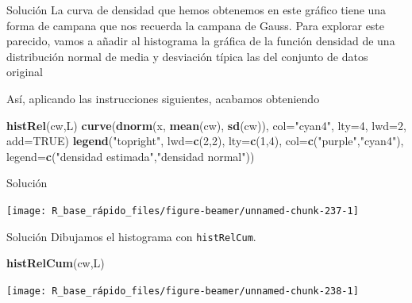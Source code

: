 \documentclass[
  ignorenonframetext,
  aspectratio=169]{beamer}
\newenvironment{Shaded}{\begin{snugshade}}{\end{snugshade}}
\newcommand{\AttributeTok}[1]{\textcolor[rgb]{0.13,0.29,0.53}{#1}}
\newcommand{\ConstantTok}[1]{\textcolor[rgb]{0.56,0.35,0.01}{#1}}
\newcommand{\DecValTok}[1]{\textcolor[rgb]{0.00,0.00,0.81}{#1}}
\newcommand{\FunctionTok}[1]{\textcolor[rgb]{0.13,0.29,0.53}{\textbf{#1}}}
\newcommand{\NormalTok}[1]{#1}
\newcommand{\StringTok}[1]{\textcolor[rgb]{0.31,0.60,0.02}{#1}}
\begin{document}
\begin{frame}[fragile]{Solución}
\label{soluciuxf3n-46}
La curva de densidad que hemos obtenemos en este gráfico tiene una forma
de campana que nos recuerda la campana de Gauss. Para explorar este
parecido, vamos a añadir al histograma la gráfica de la función densidad
de una distribución normal de media y desviación típica las del conjunto
de datos original

Así, aplicando las instrucciones siguientes, acabamos obteniendo

\begin{Shaded}
\begin{Highlighting}[]
\FunctionTok{histRel}\NormalTok{(cw,L)}
\FunctionTok{curve}\NormalTok{(}\FunctionTok{dnorm}\NormalTok{(x, }\FunctionTok{mean}\NormalTok{(cw), }\FunctionTok{sd}\NormalTok{(cw)), }\AttributeTok{col=}\StringTok{"cyan4"}\NormalTok{, }\AttributeTok{lty=}\DecValTok{4}\NormalTok{, }\AttributeTok{lwd=}\DecValTok{2}\NormalTok{,}
\AttributeTok{add=}\ConstantTok{TRUE}\NormalTok{)}
\FunctionTok{legend}\NormalTok{(}\StringTok{"topright"}\NormalTok{, }\AttributeTok{lwd=}\FunctionTok{c}\NormalTok{(}\DecValTok{2}\NormalTok{,}\DecValTok{2}\NormalTok{), }\AttributeTok{lty=}\FunctionTok{c}\NormalTok{(}\DecValTok{1}\NormalTok{,}\DecValTok{4}\NormalTok{), }\AttributeTok{col=}\FunctionTok{c}\NormalTok{(}\StringTok{"purple"}\NormalTok{,}\StringTok{"cyan4"}\NormalTok{),}
       \AttributeTok{legend=}\FunctionTok{c}\NormalTok{(}\StringTok{"densidad estimada"}\NormalTok{,}\StringTok{"densidad normal"}\NormalTok{))}
\end{Highlighting}
\end{Shaded}
\end{frame}

\begin{frame}{Solución}
\label{soluciuxf3n-47}
\begin{center}\texttt{[image: R\_base\_rápido\_files/figure-beamer/unnamed-chunk-237-1]} \end{center}
\end{frame}

\begin{frame}[fragile]{Solución}
\label{soluciuxf3n-48}
Dibujamos el histograma con \texttt{histRelCum}.

\begin{Shaded}
\begin{Highlighting}[]
\FunctionTok{histRelCum}\NormalTok{(cw,L)}
\end{Highlighting}
\end{Shaded}

\begin{center}\texttt{[image: R\_base\_rápido\_files/figure-beamer/unnamed-chunk-238-1]} \end{center}
\end{frame}
\end{document}
